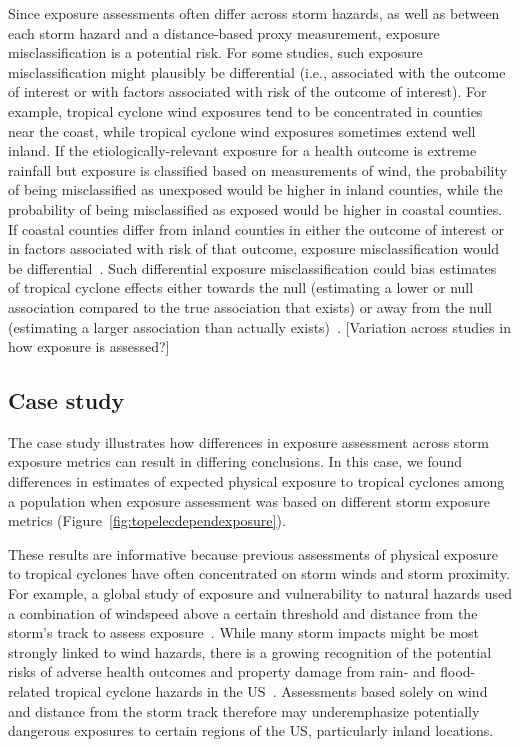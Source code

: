 Since exposure assessments often differ across storm hazards, as well as
between each storm hazard and a distance-based proxy measurement, exposure
misclassification is a potential risk. For some studies, such exposure
misclassification might plausibly be differential (i.e., associated with the
outcome of interest or with factors associated with risk of the outcome of
interest).  For example, tropical cyclone wind exposures tend to be
concentrated in counties near the coast, while tropical cyclone wind exposures
sometimes extend well inland.  If the etiologically-relevant exposure for a
health outcome is extreme rainfall but exposure is classified based on
measurements of wind, the probability of being misclassified as unexposed would
be higher in inland counties, while the probability of being misclassified as
exposed would be higher in coastal counties. If coastal counties differ from
inland counties in either the outcome of interest or in factors associated with
risk of that outcome, exposure misclassification would be
differential~\parencite{savitz2016interpreting}.  Such differential exposure
misclassification could bias estimates of tropical cyclone effects either
towards the null (estimating a lower or null association compared to the true
association that exists) or away from the null (estimating a larger association
than actually exists)~\parencite{savitz2016interpreting, armstrong1998effect}.
[Variation across studies in how exposure is assessed?]

\subsection*{Case study}

The case study illustrates how differences in exposure assessment
across storm exposure metrics can result in differing conclusions. In this 
case, we found differences in estimates of expected
physical exposure to tropical cyclones among a population when exposure
assessment was based on different storm exposure metrics
(Figure~\ref{fig:topelecdependexposure}).  

These results are informative because previous assessments of physical exposure
to tropical cyclones have often concentrated on storm winds and storm
proximity. For example, a global study of exposure and vulnerability to natural
hazards used a combination of windspeed above a certain threshold and distance
from the storm's track to assess exposure~\parencite{peduzzi2009assessing}.
While many storm impacts might be most strongly linked to wind hazards, there
is a growing recognition of the potential risks of adverse health outcomes and
property damage from rain- and flood-related tropical cyclone hazards in the
\ac{US}~\parencite{smith2009}.  Assessments based solely on wind and distance
from the storm track therefore may underemphasize potentially dangerous
exposures to certain regions of the \ac{US}, particularly inland locations. 


